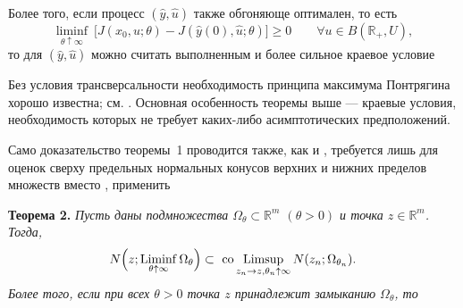 {  Более того, если процесс $(\hat{y},\hat{u})$ также обгоняюще оптимален, то есть
  \[ \liminf_{\theta\uparrow\infty}\ 
  \big[J(x_0, u; \theta)-J(\hat{y}(0), \hat{u}; \theta)\big]
  \geq 0\qquad \forall u\in B(\mathbb{R}_+,U),\]
  то для $(\hat{y},\hat{u})$ можно считать выполненным и  более сильное краевое условие
	\begin{equation*}
\label{khlopin_ALL2}
\end{equation*}
}


 Без условия трансверсальности необходимость принципа максимума Понтрягина хорошо известна; см. \cite{Halkin}. Основная особенность теоремы выше ---  краевые условия, необходимость которых не требует каких-либо асимптотических предположений. 
 
 
 
  
  	Само доказательство теоремы~1 проводится также, как и \cite[Theorem~4.1,Theorem~4.6]{arxiv}, требуется лишь  для оценок сверху  предельных нормальных конусов верхних и нижних пределов множеств вместо \cite[Lemma~6.1,6.7]{arxiv},
  	\cite[Theorem~6.2]{Ledyaev} применить
	
	{\bf Теорема 2.} {\it       Пусть даны подмножества  $\Omega_\theta\subset\mathbb{R}^m$  $(\theta> 0)$ и 
		точка $z\in\mathbb{R}^m$. Тогда,
				\begin{align*}
		N\Big(z;\mathop{  \rm{Liminf}}_{\theta\uparrow\infty}\Omega_\theta\Big)\subset 
			\mathop{\hbox{  \rm{co}}}
		\mathop{  \rm{Limsup}}_{{z}_n\to z,\theta_n\uparrow\infty}  {N}({z}_n;\Omega_{\theta_n}).
		\end{align*}
		Более того, если при всех  $\theta> 0$
		точка $z$ принадлежит замыканию $\Omega_\theta$, то
				\begin{align*}
		\end{align*}
	}
	
